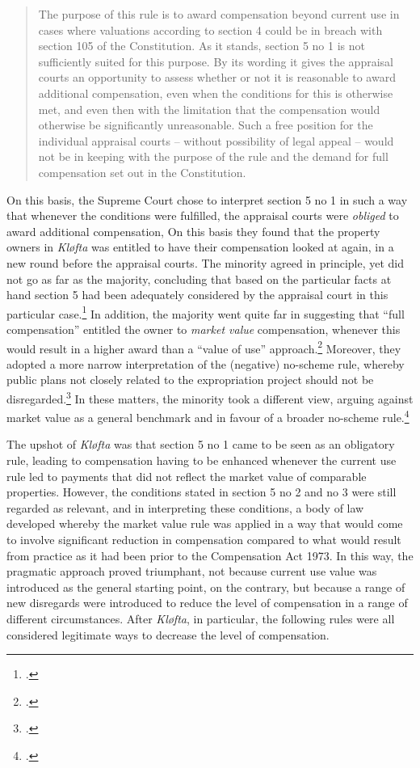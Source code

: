 \begin{quote}
The purpose of this rule is to award compensation beyond current use in cases where valuations according to section 4 could be in breach with section 105 of the Constitution. As it stands, section 5 no 1 is not sufficiently suited for this purpose. By its wording it gives the appraisal courts an opportunity to assess whether or not it is reasonable to award additional compensation, even when the conditions for this is otherwise met, and even then with the limitation that the compensation would otherwise be significantly unreasonable. Such a free position for the individual appraisal courts -- without possibility of legal appeal -- would not be in keeping with the purpose of the rule and the demand for full compensation set out in the Constitution.
\end{quote}

On this basis, the Supreme Court chose to interpret section 5 no 1 in such a way that whenever the conditions were fulfilled, the appraisal courts were \emph{obliged} to award additional compensation, On this basis they found that the property owners in \emph{Kløfta} was entitled to have their compensation looked at again, in a new round before the appraisal courts. The minority agreed in principle, yet did not go as far as the majority, concluding that based on the particular facts at hand section 5 had been adequately considered by the appraisal court in this particular case.\footcite[22]{klofta76} In addition, the majority went quite far in suggesting that ``full compensation'' entitled the owner to {\it market value} compensation, whenever this would result in a higher award than a ``value of use'' approach.\footcite[14]{klofta76} Moreover, they adopted a more narrow interpretation of the (negative) no-scheme rule, whereby public plans not closely related to the expropriation project should not be disregarded.\footcite[15-16]{klofta76} In these matters, the minority took a different view, arguing against market value as a general benchmark and in favour of a broader no-scheme rule.\footnote{\cite[22-23|30-31]{klofta16}.}

The upshot of \emph{Kløfta} was that section 5 no 1 came to be seen as an obligatory rule, leading to compensation having to be enhanced whenever the current use rule led to payments that did not reflect the market value of comparable properties. However, the conditions stated in section 5 no 2 and no 3 were still regarded as relevant, and in interpreting these conditions, a body of law developed whereby the market value rule was applied in a way that would come to involve significant reduction in compensation compared to what would result from practice as it had been prior to the Compensation Act 1973. In this way, the pragmatic approach proved triumphant, not because current use value was introduced as the general starting point, on the contrary, but because a range of new disregards were introduced to reduce the level of compensation in a range of different circumstances. After \emph{Kløfta}, in particular, the following rules were all considered legitimate ways to decrease the level of compensation.

